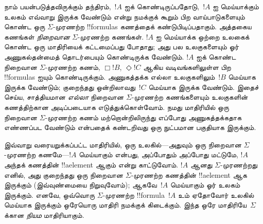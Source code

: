 \documentclass[../../../include/open-logic-section]{subfiles}
\begin{document}
நாம் பயன்படுத்தவிருக்கும் தந்திரம்,~$!A$ ஐக் கொண்டிருப்பதோடு,~$!A$ ஐ
மெய்யாக்கும் உலகம் எவ்வாறு இருக்க வேண்டும் என்று நமக்குக் கூறும் பிற
வாய்பாடுகளையும் கொண்ட ஒரு $\Sigma$-முரணற்ற !!{formula}s கணத்தைக்
கண்டுபிடிப்பதாகும். அத்தகைய கணங்கள் \emph{நிறைவான} $\Sigma$-முரணற்ற
கணங்கள். $!A$ ஐ மெய்யாக்க ஒற்றை உலகைக் கொண்ட ஒரு மாதிரியைக் கட்டமைப்பது
போதாது; அது பல உலகுகளையும் ஓர் அணுகல்தன்மைத் தொடர்பையும் கொண்டிருக்க
வேண்டும். $!A$ ஐக் கொண்ட நிறைவான $\Sigma$-முரணற்ற கணம், $\Box !B$,
$\Diamond !C$ ஆகிய வடிவங்களிலுள்ள பிற !!{formula}s ஐயும் கொண்டிருக்கும்.
அணுகத்தக்க எல்லா உலகுகளிலும்~$!B$ மெய்யாக இருக்க வேண்டும்; குறைந்தது
ஒன்றிலாவது~$!C$ மெய்யாக இருக்க வேண்டும். இதைச் செய்ய, சாத்தியமான
\emph{எல்லா} நிறைவான $\Sigma$-முரணற்ற கணங்களையும் உலகுகளின் கணத்திற்கான
அடிப்படையாக எடுத்துக்கொள்வோம். நமது மாதிரியில் ஒரு நிறைவான
$\Sigma$-முரணற்ற கணம் மற்றொன்றிலிருந்து எப்போது அணுகத்தக்கதாக எண்ணப்பட
வேண்டும் என்பதைக் கண்டறிவது ஒரு நுட்பமான பகுதியாக இருக்கும்.

இவ்வாறு வரையறுக்கப்பட்ட மாதிரியில், ஒரு உலகில்---அதுவும் ஒரு நிறைவான
$\Sigma$-முரணற்ற கணமே---$!A$ மெய்யாகும் என்பது, அப்போதும் அப்போது மட்டுமே,
$!A$ அந்தக் கணத்தின் !!a{element} ஆகும் என்று காட்டுவோம். $!A$ ஆனது
$\Sigma$-முரணற்றது எனில், அது குறைந்தது ஒரு நிறைவான $\Sigma$-முரணற்ற
கணத்தின் !!a{element} ஆக இருக்கும் (இவ்வுண்மையை நிறுவுவோம்); ஆகவே~$!A$
மெய்யாகும் ஓர் உலகம் இருக்கும். எனவே, ஒவ்வொரு $\Sigma$-முரணற்ற
!!{formula}~$!A$ உம் ஏதோவோர் உலகில் மெய்யாக இருக்கும் ஒரேயொரு மாதிரி
நமக்குக் கிடைக்கும். இந்த ஒரே மாதிரியே~$\Sigma$ க்கான \emph{நியம}
மாதிரியாகும்.
\end{document}
